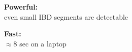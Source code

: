 \documentclass[11pt, mathserif, aspectratio=169]{beamer}
\newenvironment{wideitemize}{\itemize\addtolength{\itemsep}{10pt}}{\enditemize}
\begin{document}
\begin{frame}
\begin{minipage}{.75\linewidth}
\vspace{5mm}


\end{minipage}\begin{minipage}{.3\linewidth}
\begin{center}
{\small
\begin{wideitemize}
\item {\bf Powerful:}\\ even small IBD segments are detectable
\item {\bf Fast:}\\ $\approx 8$ sec on a laptop
\end{wideitemize}
}
\end{center}
\end{minipage}

\end{frame}
\end{document}
